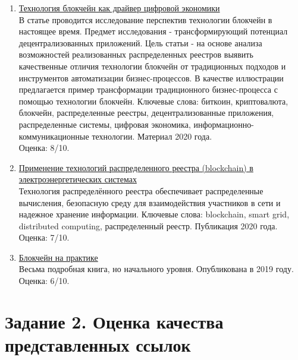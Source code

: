 \documentclass[a4paper, 12pt]{report}		%
\begin{document}
\begin{enumerate}
\item \href{https://elibrary.ru/item.asp?id=44236813}{Технология блокчейн как драйвер цифровой экономики}\\
В статье проводится исследование перспектив технологии блокчейн в настоящее время. Предмет исследования - трансформирующий потенциал децентрализованных приложений. Цель статьи - на основе анализа возможностей реализованных распределенных реестров выявить качественные отличия технологии блокчейн от традиционных подходов и инструментов автоматизации бизнес-процессов. В качестве иллюстрации предлагается пример трансформации традиционного бизнес-процесса с помощью технологии блокчейн. Ключевые слова: биткоин, криптовалюта, блокчейн, распределенные реестры, децентрализованные приложения, распределенные системы, цифровая экономика, информационно-коммуникационные технологии. Материал 2020 года.\\
Оценка: 8/10.
\item \href{https://cyberleninka.ru/article/n/primenenie-tehnologiy-raspredelennogo-reestra-blockchain-v-elektroenergeticheskih-sistemah}{Применение технологий распределенного реестра (blockchain) в электроэнергетических системах}\\
Технология распределённого реестра обеспечивает распределенные вычисления, безопасную среду для взаимодействия участников в сети и надежное хранение информации. Ключевые слова: blockchain, smart grid, distributed computing, распределенный реестр. Публикация 2020 года.\\
Оценка: 7/10.
\item \href{https://books.google.ru/books?id=R5aRDwAAQBAJ&lpg=PT2&ots=K3b2kZeO2J&dq=%D0%A0%D0%B0%D1%81%D0%BF%D1%80%D0%B5%D0%B4%D0%B5%D0%BB%D0%B5%D0%BD%D0%BD%D1%8B%D0%B5%20%D1%80%D0%B5%D0%B5%D1%81%D1%82%D1%80%D1%8B%20(%D0%B1%D0%BB%D0%BE%D0%BA%D1%87%D0%B5%D0%B9%D0%BD)%20%D0%BD%D0%BE%D0%B2%D1%8B%D0%B5%20%D0%BA%D0%BE%D0%BD%D1%86%D0%B5%D0%BF%D1%86%D0%B8%D0%B8%20%D0%B8%20%D1%82%D0%B5%D1%85%D0%BD%D0%BE%D0%BB%D0%BE%D0%B3%D0%B8%D0%B8%20%D0%BF%D0%BE%D1%81%D0%BB%D0%B5%D0%B4%D0%BD%D0%B8%D1%85%20%D0%BB%D0%B5%D1%82&lr&pg=PT2#v=onepage&q&f=false}{Блокчейн на практике}\\
Весьма подробная книга, но начального уровня. Опубликована в 2019 году.\\
Оценка: 6/10.
\end{enumerate}

\chapter*{Задание 2. Оценка качества представленных ссылок}
\end{document}

